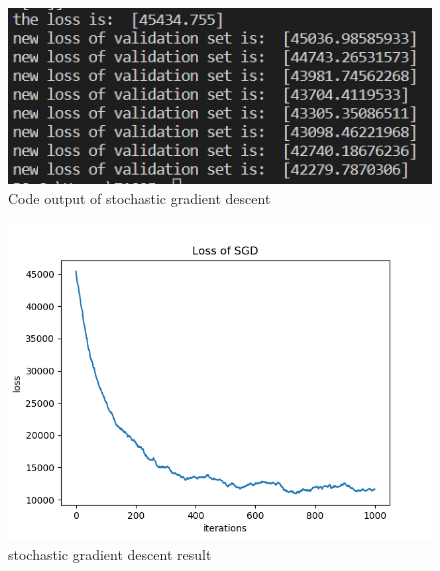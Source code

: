 \documentclass[journal, a4paper]{IEEEtran}
\begin{document}
	\begin{figure}[!hbt]
		\begin{center}
		\includegraphics[width=\columnwidth]{sto.png}
		\caption{Code output of stochastic gradient descent}
		\label{fig3}
		\end{center}
	\end{figure}

    \begin{figure}[!hbt]
		\begin{center}
		\includegraphics[width=\columnwidth]{sto_re.png}
		\caption{stochastic gradient descent result}
		\label{fig4}
		\end{center}
	\end{figure}
\end{document}
